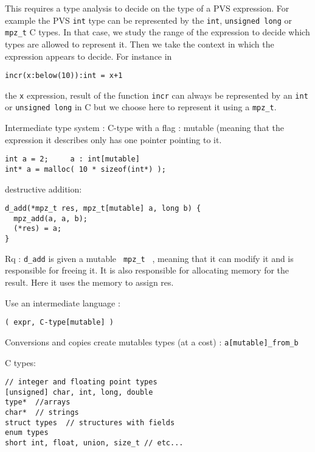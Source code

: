 \documentclass[12pt,a4paper]{article}
\newcommand{\cl}[1]{\texttt{#1}}
\newcommand{\mpzt}{ \texttt{ mpz\_t } }
\begin{document}
This requires a type analysis to decide on the type of a PVS expression. For example the PVS \cl{int} type can be represented by the \cl{int}, \cl{unsigned long} or \cl{mpz\_t} C types. In that case, we study the range of the expression to decide which types are allowed to represent it. Then we take the context in which the expression appears to decide. For instance in
\begin{lstlisting}
incr(x:below(10)):int = x+1
\end{lstlisting}
the \cl{x} expression, result of the function \cl{incr} can always be represented by an \cl{int} or \cl{unsigned long} in C but we choose here to represent it using a \cl{mpz\_t}.

Intermediate type system :
C-type with a flag : mutable (meaning that the expression it describes only has one pointer pointing to it.

\begin{lstlisting}
int a = 2;     a : int[mutable]
int* a = malloc( 10 * sizeof(int*) );  
\end{lstlisting}

destructive addition:

\begin{lstlisting}
d_add(*mpz_t res, mpz_t[mutable] a, long b) {
  mpz_add(a, a, b);
  (*res) = a;
}
\end{lstlisting}

Rq : \cl{d\_add} is given a mutable \mpzt, meaning that it can modify it and is responsible for freeing it.
It is also responsible for allocating memory for the result.
Here it uses the memory to assign res.



Use an intermediate language :

\begin{lstlisting}
( expr, C-type[mutable] )
\end{lstlisting}

Conversions and copies create mutables types (at a cost) :
\cl{a[mutable]\_from\_b}

\cite{fillcomp}







C types:\\
\cite{huss2004c}
\begin{lstlisting}[caption=C types]
// integer and floating point types
[unsigned] char, int, long, double
type*  //arrays
char*  // strings
struct types  // structures with fields
enum types
short int, float, union, size_t // etc...
\end{lstlisting}
\end{document}
